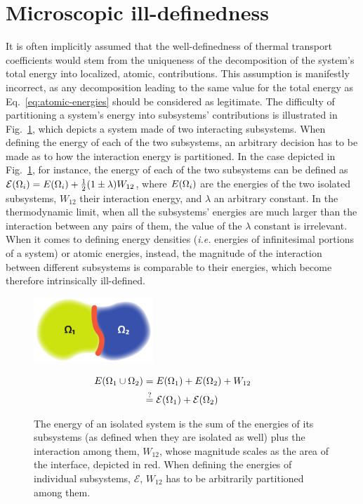 \section{Microscopic ill-definedness} \label{sec:micro-illdef}

It is often implicitly assumed that the well-definedness of thermal transport coefficients would stem from the uniqueness of the decomposition of the system's total energy into localized, atomic, contributions. This assumption is manifestly incorrect, as any decomposition leading to the same value for the total energy as Eq.~\eqref{eq:atomic-energies} should be considered as legitimate. The difficulty of partitioning a system's energy into subsystems' contributions is illustrated in Fig.~\ref{fig:energy-partition}, which depicts a system made of two interacting subsystems. When defining the energy of each of the two subsystems, an arbitrary decision has to be made as to how the interaction energy is partitioned. In the case depicted in Fig.~\ref{fig:energy-partition}, for instance, the energy of each of the two subsystems can be defined as $\mathcal{E}({\mathrm\Omega}_i) = E({\mathrm\Omega}_i) + \frac{1}{2}(1\pm\lambda)W_{12}$, where $E({\mathrm\Omega}_i)$ are the energies of the two isolated subsystems, $W_{12}$ their interaction energy, and $\lambda$ an arbitrary constant. In the thermodynamic limit, when all the subsystems' energies are much larger than the interaction between any pairs of them, the value of the $\lambda$ constant is irrelevant. When it comes to defining energy densities (\emph{i.e.} energies of infinitesimal portions of a system) or atomic energies, instead, the magnitude of the interaction between different subsystems is comparable to their energies, which become therefore intrinsically ill-defined.

\begin{figure}[t]
    \begin{minipage}{0.45\textwidth}
        \centering \includegraphics[width=4.5cm]{chapters/chapter3/figures/blob.jpg}
    \end{minipage}
    \begin{minipage}{0.45\textwidth}
        \begin{align*}
        E({\mathrm\Omega}_{1}\cup{\mathrm\Omega}_2) &= E({\mathrm\Omega}_1) + E({\mathrm\Omega}_2) + W_{12} \qquad \\
        & \overset{?}{=}\mathcal{E}({\mathrm\Omega}_1)+\mathcal{E}({\mathrm\Omega}_2)
        \end{align*}
    \end{minipage}
\caption{
	The energy of an isolated system is the sum of the energies of its subsystems (as defined when they are isolated as well) plus the interaction among them, $W_{12}$, whose magnitude scales as the area of the interface, depicted in red. When defining the energies of individual subsystems, $\mathcal{E}$, $W_{12}$ has to be arbitrarily partitioned among them.
	}
	\label{fig:energy-partition}
\end{figure}

